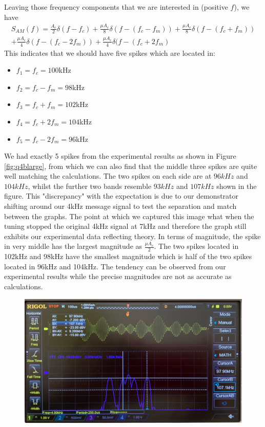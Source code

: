 \documentclass[11pt]{article}
\begin{document}
\begin{enumerate}[label=(\alph*)]
Leaving those frequency components that we are interested in (positive $f$), we have
\begin{align*}
    S_{AM}(f) = \frac{A_c}{2} \delta(f-f_c)+ \frac{\mu A_c}{8}\delta (f-(f_c-f_m)) + \frac{\mu A_c}{8} \delta (f-(f_c+f_m)) \\ +\frac{\mu A_c}{4}\delta (f-(f_c-2f_m)) +\frac{\mu A_c}{4} \delta (f-(f_c+2f_m) 
\end{align*}
This indicates that we should have five spikes which are located in:
\begin{multicols}{3}
\begin{itemize}
    \item $f_1=f_c=100$kHz
    \item $f_2=f_c-f_m=98$kHz
    \item $f_3=f_c+f_m=102$kHz
    \item $f_4=f_c+2f_m=104$kHz
    \item $f_5=f_c-2f_m=96$kHz
\end{itemize}
\end{multicols}
We had exactly 5 spikes from the experimental results as shown in Figure \ref{fig:q4blarge}, from which we can also find that the middle three spikes are quite well matching the calculations. The two spikes on each side are at $96kHz$ and $104kHz$, whilst the further two bands resemble $93kHz$ and $107kHz$ shown in the figure. This "discrepancy" with the expectation is due to our demonstrator shifting around our 4kHz message signal to test the separation and match between the graphs. The point at which we captured this image what when the tuning stopped the original 4kHz signal at 7kHz and therefore the graph still exhibits our experimental data reflecting theory. In terms of magnitude, the spike in very middle has the largest magnitude as $\frac{\mu A_c}{2}$. The two spikes located in 102kHz and 98kHz have the smallest magnitude which is half of the two spikes located in 96kHz and 104kHz. The tendency can be observed from our experimental results while the precise magnitudes are not as accurate as calculations. 
\begin{figure}[H]
    \centering
    \includegraphics[scale = 0.15]{Q4bLmu.jpg}

\end{figure}
\end{enumerate}
\end{document}
